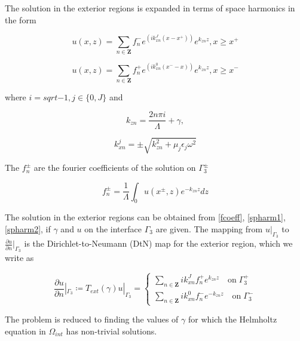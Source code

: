 The solution in the exterior regions is expanded in terms of space
harmonics in the form

\begin{equation}
u(x,z) = \sum_{n \in \mathbf{Z}} f_n^- e^{(ik_{xn}^J(x -
x^+))} e^{k_{zn}z}, x \geq x^+
\label{spharm1}
\end{equation}

\begin{equation}
u(x,z) = \sum_{n \in \mathbf{Z}} f_n^+ e^{(ik_{xn}^0(x^- -
x))} e^{k_{zn}z}, x \geq x^-
\label{spharm2}
\end{equation}

where $i = sqrt{-1}, j \in \lbrace 0,J \rbrace$ and

\begin{equation} k_{zn} = \frac{2 n \pi i}{\Lambda} + \gamma,
\end{equation}

\begin{equation} k_{xn}^j = \pm \sqrt{k_{zn}^2 + \mu_j \epsilon_j
\omega^2}
\end{equation}

The $f_n^\pm$ are the fourier coefficients of the solution on
$\Gamma_3^\pm$

\begin{equation}
f_n^\pm = \frac{1}{\Lambda}\int_0 u(x^\pm,z) e^{-k_{zn} z} dz
\label{fcoeff}
\end{equation}

The solution in the exterior regions can be obtained from
\ref{fcoeff}, \ref{spharm1}, \ref{spharm2}, if $\gamma$ and $u$ on the
interface $\Gamma_3$ are given. The mapping from $u|_{\Gamma_3}$ to
$\frac{\partial u}{\partial n} |_{\Gamma_3}$ is the
Dirichlet-to-Neumann (DtN) map for the exterior region, which we write
as

\begin{equation}
\frac{\partial u}{\partial n} |_{\Gamma_3} \coloneqq T_{ext}(\gamma)
u|_{\Gamma_3} = \left \{ \begin{array}{ll} \sum_{n \in \mathbf{Z}} i
k_{xn}^J f_n^+ e^{k_{zn}z} \quad \textrm{on} \; \Gamma_3^+ \\
\sum_{n \in \mathbf{Z}} ik_{xn}^0 f_n^- e^{-k_{zn}z} \quad
\textrm{on}\; \Gamma_3^- \end{array}\right .
\end{equation}

The problem is reduced to finding the values of $\gamma$ for which the
Helmholtz equation in $\Omega_{int}$ has non-trivial solutions.

